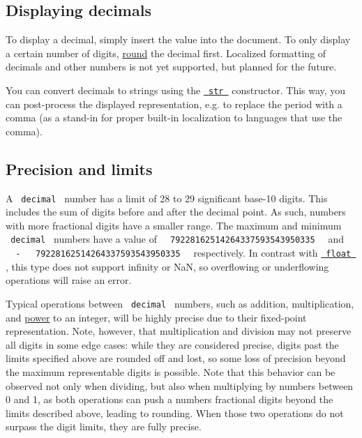 \subsection{Displaying decimals}\label{displaying-decimals}

To display a decimal, simply insert the value into the document. To only
display a certain number of digits,
\href{/docs/reference/foundations/calc/\#functions-round}{round} the
decimal first. Localized formatting of decimals and other numbers is not
yet supported, but planned for the future.

You can convert decimals to strings using the
\href{/docs/reference/foundations/str/}{\texttt{\ str\ }} constructor.
This way, you can post-process the displayed representation, e.g. to
replace the period with a comma (as a stand-in for proper built-in
localization to languages that use the comma).

\subsection{Precision and limits}\label{precision-and-limits}

A \texttt{\ decimal\ } number has a limit of 28 to 29 significant
base-10 digits. This includes the sum of digits before and after the
decimal point. As such, numbers with more fractional digits have a
smaller range. The maximum and minimum \texttt{\ decimal\ } numbers have
a value of
\texttt{\ }{\texttt{\ 79228162514264337593543950335\ }}\texttt{\ } and
\texttt{\ }{\texttt{\ -\ }}\texttt{\ }{\texttt{\ 79228162514264337593543950335\ }}\texttt{\ }
respectively. In contrast with
\href{/docs/reference/foundations/float/}{\texttt{\ float\ }} , this
type does not support infinity or NaN, so overflowing or underflowing
operations will raise an error.

Typical operations between \texttt{\ decimal\ } numbers, such as
addition, multiplication, and
\href{/docs/reference/foundations/calc/\#functions-pow}{power} to an
integer, will be highly precise due to their fixed-point representation.
Note, however, that multiplication and division may not preserve all
digits in some edge cases: while they are considered precise, digits
past the limits specified above are rounded off and lost, so some loss
of precision beyond the maximum representable digits is possible. Note
that this behavior can be observed not only when dividing, but also when
multiplying by numbers between 0 and 1, as both operations can push a
number\textquotesingle s fractional digits beyond the limits described
above, leading to rounding. When those two operations do not surpass the
digit limits, they are fully precise.

